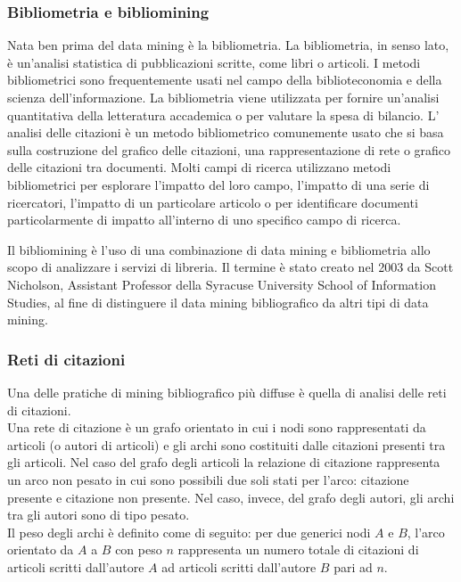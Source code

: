 \documentclass[a4paper, 12pt]{article}
\begin{document}
\subsubsection{Bibliometria e bibliomining}
Nata ben prima del data mining è la bibliometria. La bibliometria, in senso lato, è un'analisi statistica di pubblicazioni scritte, come libri o articoli. I metodi bibliometrici sono frequentemente usati nel campo della biblioteconomia e della scienza dell'informazione. La bibliometria viene utilizzata per fornire un'analisi quantitativa della letteratura accademica o per valutare la spesa di bilancio. L' analisi delle citazioni è un metodo bibliometrico comunemente usato che si basa sulla costruzione del grafico delle citazioni, una rappresentazione di rete o grafico delle citazioni tra documenti. Molti campi di ricerca utilizzano metodi bibliometrici per esplorare l'impatto del loro campo, l'impatto di una serie di ricercatori, l'impatto di un particolare articolo o per identificare documenti particolarmente di impatto all'interno di uno specifico campo di ricerca.
\par
Il bibliomining è l'uso di una combinazione di data mining e bibliometria allo scopo di analizzare i servizi di libreria. Il termine è stato creato nel 2003 da Scott Nicholson, Assistant Professor della Syracuse University School of Information Studies, al fine di distinguere il data mining bibliografico da altri tipi di data mining.
\subsubsection{Reti di citazioni}
Una delle pratiche di mining bibliografico più diffuse è quella di analisi delle reti di citazioni. \\
Una rete di citazione è un grafo orientato in cui i nodi sono rappresentati da articoli (o autori di articoli) e gli archi sono costituiti dalle citazioni presenti tra gli articoli. Nel caso del grafo degli articoli la relazione di citazione rappresenta un arco non pesato in cui sono possibili due soli stati per l'arco: citazione presente e citazione non presente.
Nel caso, invece, del grafo degli autori, gli archi tra gli autori sono di tipo pesato. \\
Il peso degli archi è definito come di seguito: per due generici nodi $A$ e $B$, l'arco orientato da $A$ a $B$ con peso $n$ rappresenta un numero totale di citazioni di articoli scritti dall'autore $A$ ad articoli scritti dall'autore $B$ pari ad $n$.
\end{document}
